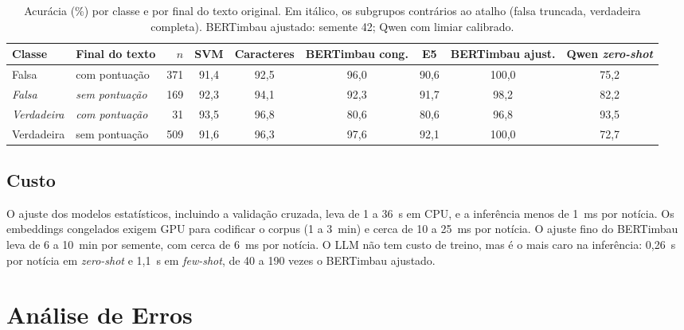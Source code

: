 \begin{table}[t]
\centering\small
\begin{adjustbox}{max width=\textwidth}
\begin{tabular}{llrcccccc}
\toprule
Classe & Final do texto & $n$ & SVM & Caracteres & BERTimbau cong. & E5 & BERTimbau ajust. & Qwen \emph{zero-shot} \\
\midrule
Falsa & com pontuação & 371 & 91,4 & 92,5 & 96,0 & 90,6 & 100,0 & 75,2 \\
\emph{Falsa} & \emph{sem pontuação} & 169 & 92,3 & 94,1 & 92,3 & 91,7 & 98,2 & 82,2 \\
\emph{Verdadeira} & \emph{com pontuação} & 31 & 93,5 & 96,8 & 80,6 & 80,6 & 96,8 & 93,5 \\
Verdadeira & sem pontuação & 509 & 91,6 & 96,3 & 97,6 & 92,1 & 100,0 & 72,7 \\
\bottomrule
\end{tabular}
\end{adjustbox}
\caption{Acurácia (\%) por classe e por final do texto original. Em itálico, os subgrupos contrários ao atalho (falsa truncada, verdadeira completa). BERTimbau ajustado: semente 42; Qwen com limiar calibrado.}
\label{tab:final}
\end{table}

\subsection{Custo}

O ajuste dos modelos estatísticos, incluindo a validação cruzada, leva de 1 a 36~s em CPU, e a inferência menos de 1~ms por notícia. Os embeddings congelados exigem GPU para codificar o corpus (1 a 3~min) e cerca de 10 a 25~ms por notícia. O ajuste fino do BERTimbau leva de 6 a 10~min por semente, com cerca de 6~ms por notícia. O LLM não tem custo de treino, mas é o mais caro na inferência: 0,26~s por notícia em \emph{zero-shot} e 1,1~s em \emph{few-shot}, de 40 a 190 vezes o BERTimbau ajustado.

\section{Análise de Erros}

